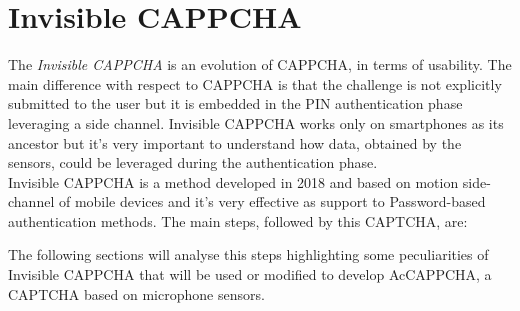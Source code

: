 \chapter{Invisible CAPPCHA}\label{chapter:InvisibleCAPPCHA}
The \textit{Invisible CAPPCHA} is an evolution of CAPPCHA, in terms of usability\cite{Invisible_CAPPCHA}. The main difference with respect to CAPPCHA is that the challenge is not explicitly submitted to the user but it is embedded in the PIN authentication phase leveraging a side channel. Invisible CAPPCHA works only on smartphones as its ancestor but it's very important to understand how data, obtained by the sensors, could be leveraged during the authentication phase.\\
Invisible CAPPCHA is a method developed in 2018 and based on motion side-channel of mobile devices and it's very effective as support to Password-based authentication methods. The main steps, followed by this CAPTCHA, are:
\begin{enumerate}
\end{enumerate}
The following sections will analyse this steps highlighting some peculiarities of Invisible CAPPCHA that will be used or modified to develop AcCAPPCHA, a CAPTCHA based on microphone sensors.

